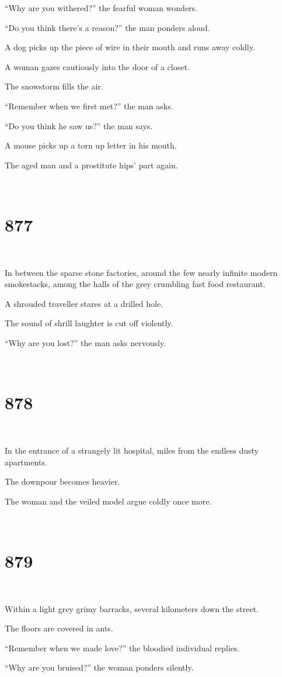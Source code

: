 \documentclass{report}
\begin{document}
``Why are you withered?'' the fearful woman wonders.

``Do you think there's a reason?'' the man ponders aloud.

A dog picks up the piece of wire in their mouth and runs away coldly.

A woman gazes cautiously into the door of a closet.

The snowstorm fills the air.

``Remember when we first met?'' the man asks.

``Do you think he saw us?'' the man says.

A mouse picks up a torn up letter in his mouth.

The aged man and a prostitute hips' part again.

~
\chapter*{877}
~

In between the sparse stone factories, around the few nearly infinite modern smokestacks, among the halls of the grey crumbling fast food restaurant.

A shrouded traveller stares at a drilled hole.

The sound of shrill laughter is cut off violently.

``Why are you lost?'' the man asks nervously.

~
\chapter*{878}
~

In the entrance of a strangely lit hospital, miles from the endless dusty apartments.

The downpour becomes heavier.

The woman and the veiled model argue coldly once more.

~
\chapter*{879}
~

Within a light grey grimy barracks, several kilometers down the street.

The floors are covered in ants.

``Remember when we made love?'' the bloodied individual replies.

``Why are you bruised?'' the woman ponders silently.
\end{document}
